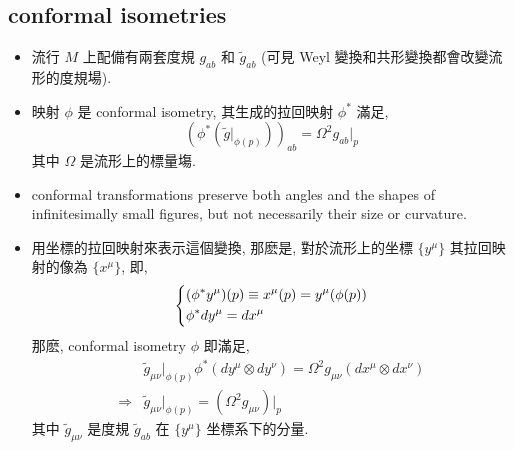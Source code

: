 \subsection{conformal isometries}
\begin{itemize}
	\item 流行 $M$ 上配備有兩套度規 $g_{a b}$ 和 $\tilde{g}_{a b}$ (可見 Weyl 變換和共形變換都會改變流形的度規場).
	
	\item 映射 $\phi$ 是 conformal isometry, 其生成的拉回映射 $\phi^*$ 滿足,
	\begin{equation}
		(\phi^* (\tilde{g} \Big|_{\phi(p)}))_{a b} = \Omega^2 g_{a b} \Big|_p
	\end{equation}
	其中 $\Omega$ 是流形上的標量塲.
	
	\item conformal transformations preserve both angles and the shapes of infinitesimally small figures, but not necessarily their size or curvature.
	
	\item 用坐標的拉回映射來表示這個變換, 那麽是, 對於流形上的坐標 $\{ y^\mu \}$ 其拉回映射的像為 $\{ x^\mu \}$, 即,
	\begin{equation}
		\begin{dcases}
			(\phi^* y^\mu)(p) \equiv x^\mu(p) = y^\mu(\phi(p)) \\
			\phi^* dy^\mu = dx^\mu
		\end{dcases}
	\end{equation}
	那麽, conformal isometry $\phi$ 即滿足,
	\begin{align}
		& \tilde{g}_{\mu \nu}\Big|_{\phi(p)} \phi^*(dy^\mu \otimes dy^\nu) = \Omega^2 g_{\mu \nu} (dx^\mu \otimes dx^\nu) \\
		\Longrightarrow & \tilde{g}_{\mu \nu}\Big|_{\phi(p)} = (\Omega^2 g_{\mu \nu})\Big|_{p}
	\end{align}
	其中 $\tilde{g}_{\mu \nu}$ 是度規 $\tilde{g}_{a b}$ 在 $\{ y^\mu \}$ 坐標系下的分量.
\end{itemize}

